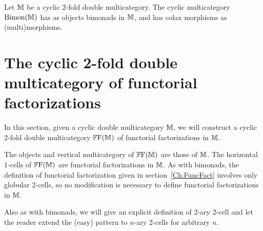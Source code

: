 \begin{definition}
	Let $\mathbb{M}$ be a cyclic 2-fold double multicategory. The cyclic multicategory $\mathrm{Bimon}(\mathbb{M})$ has as objects bimonads in $\mathbb{M}$, and has colax morphisms as (multi)morphisms.
\end{definition}

\section{The cyclic 2-fold double multicategory of functorial factorizations}

In this section, given a cyclic double multicategory $\mathbb{M}$, we will construct a cyclic 2-fold double multicategory $\mathbb{F}\mathrm{F}(\mathbb{M})$ of functorial factorizations in $\mathbb{M}$.

The objects and vertical multicategory of $\mathbb{F}\mathrm{F}(\mathbb{M})$ are those of $\mathbb{M}$. The horizontal 1-cells of $\mathbb{F}\mathrm{F}(\mathbb{M})$ are functorial factorizations in $\mathbb{M}$. As with bimonads, the definition of functorial factorization given in section~\ref{Ch:FuncFact} involves only globular 2-cells, so no modification is necessary to define functorial factorizations in $\mathbb{M}$.

Also as with bimonads, we will give an explicit definition of 2-ary 2-cell and let the reader extend the (easy) pattern to $n$-ary 2-cells for arbitrary $n$.

